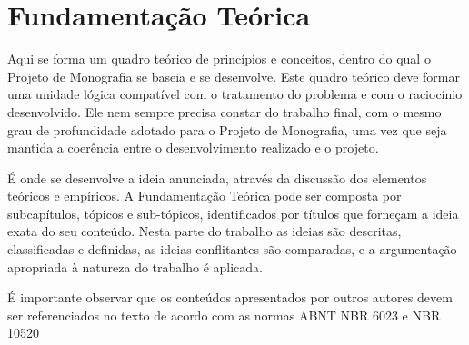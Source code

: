 \chapter{Fundamentação Teórica}
\thispagestyle{empty}
Aqui se forma um quadro teórico de princípios e conceitos, dentro do qual o Projeto de Monografia se baseia e se desenvolve. Este quadro teórico deve formar uma unidade lógica compatível com o tratamento do problema e com o raciocínio desenvolvido. Ele nem sempre precisa constar do trabalho final, com o mesmo grau de profundidade adotado para o Projeto de Monografia, uma vez que seja mantida a coerência entre o desenvolvimento realizado e o projeto.

É onde se desenvolve a ideia anunciada, através da discussão dos elementos teóricos e empíricos. A Fundamentação Teórica pode ser composta por subcapítulos, tópicos e sub-tópicos, identificados por títulos que forneçam a ideia exata do seu conteúdo. Nesta parte do trabalho as ideias são descritas, classificadas e definidas, as ideias conflitantes são comparadas, e a argumentação apropriada à natureza do trabalho é aplicada.

É importante observar que os conteúdos apresentados por outros autores devem ser referenciados no texto de acordo com as normas ABNT NBR 6023 e NBR 10520 
